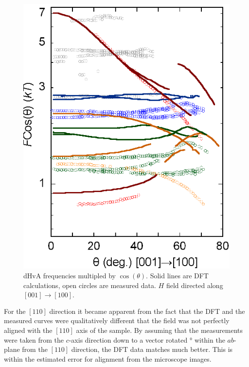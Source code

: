 \begin{figure}
    \begin{center}
        \includegraphics[scale=0.7]{Chapter3-dHvABaFe2P2/Figures/AngleDepMeasurements/AngleSweepMeasuredUnshifted/AngleSweepMeasuredUnshifted}
        \caption{dHvA frequencies multipled by $\cos(\theta)$. Solid lines are DFT calculations, open circles are measured data. $H$ field directed along $[001]\rightarrow[100]$.}
        \label{Fig:3:AngleSweepUnshifted}
    \end{center}
\end{figure}

For the $[110]$ direction it became apparent from the fact that the DFT and the measured curves were qualitatively different that the field was not perfectly aligned with the $[110]$ axis of the sample. By assuming that the measurements were taken from the $c$-axis direction down to a vector rotated \unit[10]{\degree} within the $ab$-plane from the $[110]$ direction, the DFT data matches much better. This is within the estimated error for alignment from the microscope images.

